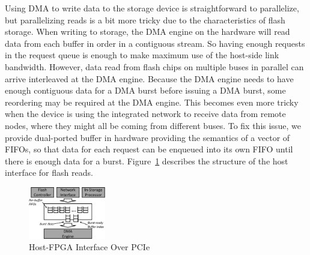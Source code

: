 Using DMA to write data to the storage device is straightforward to parallelize,
but parallelizing reads is a bit more tricky due to the characteristics of flash
storage. When writing to storage, the DMA engine on the hardware will read data
from each buffer in order in a contiguous stream. So having enough requests in
the request queue is enough to make maximum use of the host-side link bandwidth.
However, data read from flash chips on multiple buses in parallel can arrive
interleaved at the DMA engine. Because the DMA engine needs to have enough
contiguous data for a DMA burst before issuing a DMA burst, some reordering may
be required at the DMA engine. This becomes even more tricky when the device is
using the integrated network to receive data from remote nodes, where they might
all be coming from different buses. To fix this issue, we provide dual-ported
buffer in hardware providing the semantics of a vector of FIFOs, so that data
for each request can be enqueued into its own FIFO until there is enough data
for a burst.
Figure~\ref{fig:hostinterface} describes the structure of the host interface for
flash reads.

\begin{figure}[t!]
	\centering
	\includegraphics[width=0.3\textwidth]{figures/dmawrite-crop.pdf}
	\caption{Host-FPGA Interface Over PCIe}
	\label{fig:hostinterface}
\end{figure}


